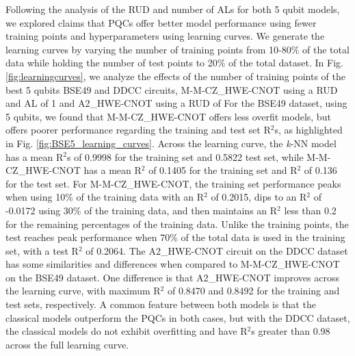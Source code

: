 \documentclass[journal=jacsat,manuscript=article]{achemso}
\begin{document}
Following the analysis of the RUD and number of ALs for both 5 qubit models, we explored claims that PQCs offer better model performance using fewer training points and hyperparameters\cite{schuld_circuit-centric_2020,du_expressive_2020,suzuki_predicting_2020} using learning curves.
We generate the learning curves by varying the number of training points from 10-80\% of the total data while holding the number of test points to 20\% of the total dataset.
In Fig. \ref{fig:learningcurves}, we analyze the effects of the number of training points of the best 5 qubits BSE49 and DDCC circuits, M-M-CZ{\_}HWE-CNOT using a RUD and AL of 1 and A2{\_}HWE-CNOT using a RUD of 
For the BSE49 dataset, using 5 qubits, we found that M-M-CZ{\_}HWE-CNOT offers less overfit models, but offers poorer performance regarding the training and test set R$^{2}$s, as highlighted in Fig. \ref{fig:BSE5_learning_curves}.
Across the learning curve, the \textit{k}-NN model has a mean R$^{2}$s of 0.9998 for the training set and 0.5822 test set, while M-M-CZ{\_}HWE-CNOT has a mean R$^{2}$ of 0.1405 for the training set and R$^{2}$ of 0.136 for the test set.
For M-M-CZ{\_}HWE-CNOT, the training set performance peaks when using 10\% of the training data with an R$^{2}$ of 0.2015, dips to an R$^{2}$ of -0.0172 using 30\% of the training data, and then maintains an R$^{2}$ less than 0.2 for the remaining percentages of the training data.
Unlike the training points, the test reaches peak performance when 70\% of the total data is used in the training set, with a test R$^{2}$ of 0.2064.
The A2{\_}HWE-CNOT circuit on the DDCC dataset has some similarities and differences when compared to M-M-CZ{\_}HWE-CNOT on the BSE49 dataset.
One difference is that A2{\_}HWE-CNOT improves across the learning curve, with maximum R$^{2}$ of 0.8470 and 0.8492 for the training and test sets, respectively.
A common feature between both models is that the classical models outperform the PQCs in both cases, but with the DDCC dataset, the classical models do not exhibit overfitting and have R$^{2}$s greater than 0.98 across the full learning curve.
\end{document}
